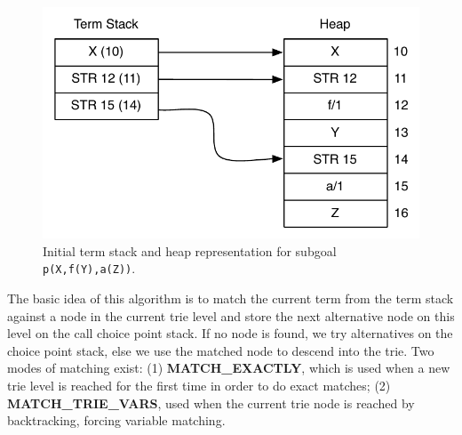 \begin{figure}[ht]
  \centering
    \includegraphics[scale=0.6]{lookup_subgoal_termstack_start.pdf}
  \caption{Initial term stack and heap representation for subgoal \texttt{p(X,f(Y),a(Z))}.}
  \label{fig:lookup_subgoal_termstack_start}
\end{figure}

The basic idea of this algorithm is to match the current term from the term stack against a node in the current
trie level and store the next alternative node on this level on the call choice point stack. If no node
is found, we try alternatives on the choice point stack, else we use the matched node to descend into the trie.
Two modes of matching exist: (1) \textbf{MATCH\_EXACTLY}, which is used when a new trie level is reached for the
first time in order to do exact matches; (2) \textbf{MATCH\_TRIE\_VARS}, used when the current trie node is reached
by backtracking, forcing variable matching.

